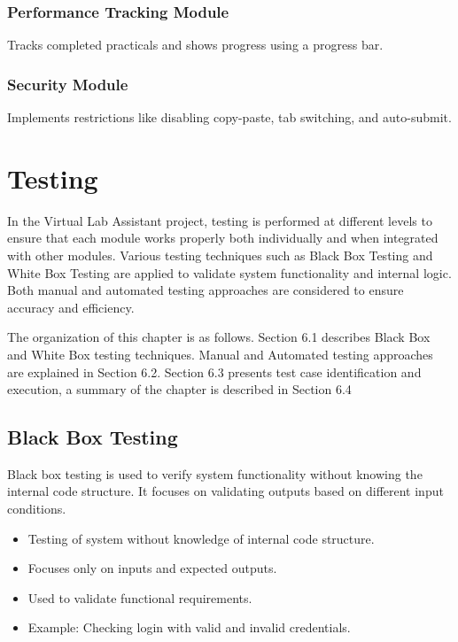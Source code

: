 \documentclass{SSBT-BE}
\begin{document}
\subsection{Performance Tracking Module}
Tracks completed practicals and shows progress using a progress bar.

\subsection{Security Module}
Implements restrictions like disabling copy-paste, tab switching, and auto-submit.

\chapter{Testing}




In the Virtual Lab Assistant project, testing is performed at different levels to ensure that each module works properly both individually and when integrated with other modules. Various testing techniques such as Black Box Testing and White Box Testing are applied to validate system functionality and internal logic. Both manual and automated testing approaches are considered to ensure accuracy and efficiency.



The organization of this chapter is as follows. Section 6.1 describes Black Box and
White Box testing techniques. Manual and Automated testing
approaches are explained in Section 6.2. Section 6.3 presents test case identification and execution,  a summary of the chapter is described in Section 6.4

\section{Black Box Testing}
Black box testing is used to verify system functionality without knowing the internal code structure.
It focuses on validating outputs based on different input conditions.

\begin{itemize}
    \item Testing of system without knowledge of internal code structure.
    \item Focuses only on inputs and expected outputs.
    \item Used to validate functional requirements.
    \item Example: Checking login with valid and invalid credentials.
\end{itemize}
\end{document}
